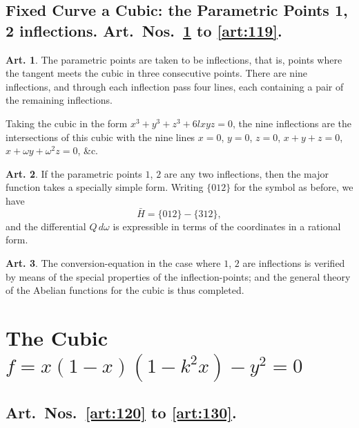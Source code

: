 \documentclass[12pt,a4paper]{article}
\theoremstyle{definition}
\newtheorem{art}{Art.}[section]
\begin{document}
\newpage
\subsection*{Fixed Curve a Cubic: the Parametric Points 1, 2 inflections. Art.~Nos.~\ref{art:114} to \ref{art:119}.}

\begin{art}\label{art:114}
The parametric points are taken to be inflections, that is, points where the tangent meets the cubic in three consecutive points. There are nine inflections, and through each inflection pass four lines, each containing a pair of the remaining inflections.

Taking the cubic in the form $x^3 + y^3 + z^3 + 6lxyz = 0$, the nine inflections are the intersections of this cubic with the nine lines $x = 0$, $y = 0$, $z = 0$, $x + y + z = 0$, $x + \omega y + \omega^2 z = 0$, \&c.
\end{art}

\begin{art}\label{art:115}
If the parametric points $1$, $2$ are any two inflections, then the major function takes a specially simple form. Writing $\{012\}$ for the symbol as before, we have
\[
\bar{H} = \{012\} - \{312\},
\]
and the differential $Q\,d\omega$ is expressible in terms of the coordinates in a rational form.
\end{art}

\begin{art}\label{art:116}
The conversion-equation in the case where $1$, $2$ are inflections is verified by means of the special properties of the inflection-points; and the general theory of the Abelian functions for the cubic is thus completed.
\end{art}

\newpage
\section*{The Cubic $f = x(1-x)(1 - k^2 x) - y^2 = 0$}

\subsection*{Art.~Nos.~\ref{art:120} to \ref{art:130}.}
\end{document}
